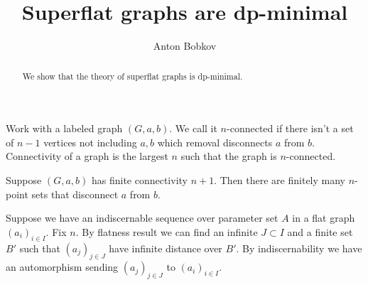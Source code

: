 \documentclass{amsart}
\begin{document}
\title{Superflat graphs are dp-minimal}
\author{Anton Bobkov}

\begin{abstract}
	We show that the theory of superflat graphs is dp-minimal.
\end{abstract}

\maketitle

Work with a labeled graph $(G, a, b)$. We call it $n$-connected if there isn't a set of $n-1$ vertices not including $a,b$ which removal disconnects $a$ from $b$. Connectivity of a graph is the largest $n$ such that the graph is $n$-connected.

\begin{Lemma}
	Suppose $(G, a, b)$ has finite connectivity $n+1$. Then there are finitely many $n$-point sets that disconnect $a$ from $b$.
\end{Lemma}

Suppose we have an indiscernable sequence over parameter set $A$ in a flat graph $(a_i)_{i \in I}$. Fix $n$. By flatness result we can find an infinite $J \subset I$ and a finite set $B'$ such that $(a_j)_{j \in J}$ have infinite distance over $B'$. By indiscernability we have an automorphism sending $(a_j)_{j \in J}$ to $(a_i)_{i \in I}$. 
\end{document}
